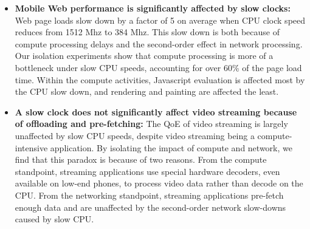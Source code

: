\begin{itemize}    

   \item {\bf Mobile Web performance is significantly affected by slow clocks:} Web page loads slow down by a
    factor of 5 on average when CPU clock speed reduces from 1512 Mhz to 384 Mhz. This slow down is both because of compute processing delays and the second-order effect in network processing. Our isolation experiments show that compute processing is more of a bottleneck under slow CPU speeds, accounting for over 60\% of the 
    page load time. Within the compute activities, Javascript evaluation is affected most by 
    the CPU slow down, and rendering and painting are affected the least.
 
   

    \item {\bf A slow clock does not significantly affect video streaming because of offloading and pre-fetching:} 
    The QoE of video streaming is largely unaffected by slow CPU speeds, despite video streaming being a compute-intensive application. By isolating the impact of compute and network, we find that this paradox is because of two reasons. From the compute standpoint, 
     streaming applications use special hardware decoders, even available on low-end phones, to process video data rather than decode on the CPU.   %
    From the networking standpoint, streaming applications pre-fetch enough data and are unaffected by the second-order network slow-downs caused by slow CPU. 
    

\end{itemize}
